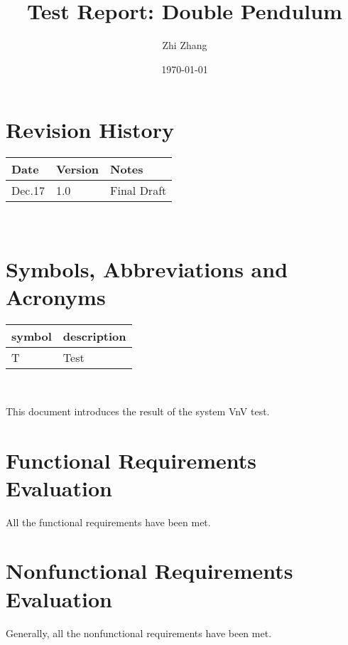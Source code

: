 \documentclass[12pt, titlepage]{article}
\begin{document}
\title{Test Report: Double Pendulum} 
\author{Zhi Zhang}
\date{\today}
  
\maketitle


\section{Revision History}

\begin{tabularx}{\textwidth}{p{3cm}p{2cm}X}
\toprule {\bf Date} & {\bf Version} & {\bf Notes}\\
\midrule
Dec.17 & 1.0 & Final Draft\\
 
\bottomrule
\end{tabularx}

~\newpage

\section{Symbols, Abbreviations and Acronyms}

\renewcommand{\arraystretch}{1.2}
\begin{tabular}{l l} 
  \toprule    
  \textbf{symbol} & \textbf{description}\\
  \midrule 
  T & Test\\
  \bottomrule
\end{tabular}\\

\newpage

\tableofcontents

\listoftables %

\listoffigures %

\newpage


This document introduces the result of the system VnV test. 

\section{Functional Requirements Evaluation}
All the functional requirements have been met. 

\section{Nonfunctional Requirements Evaluation}
Generally, all the nonfunctional requirements have been met.
\end{document}
